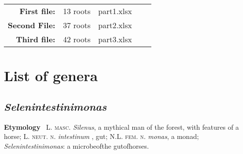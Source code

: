 
\newcommand{\obenlinks}{GAN (the Great Automatic Nomenclator)}   

   


 

\begin{center} 
  \begin{tabular}{|rlp{4cm}rl|}
  \hline
   \textbf{First file:}   & 13 roots &  part1.xlsx & & \\
   \textbf{Second File:}  & 37 roots &  part2.xlsx & & \\
   \textbf{Third file:}   & 42 roots &  part3.xlsx & & \\ \hline
\end{tabular}
\end{center} 

\section*{List of genera}



\subsection*{\textit{Selenintestinimonas}}
\textbf{Etymology} \
\textsc{L. masc.} 
\textit{Silenus}, a mythical man of the forest, with features of a horse; 
\textsc{L. neut. n.}
\textit{intestinum} , gut; 
\textsc{N.L. fem. n.} \textit{monas}, a monad;
\textit{Selenintestinimonas}: a microbeofthe gutofhorses.



